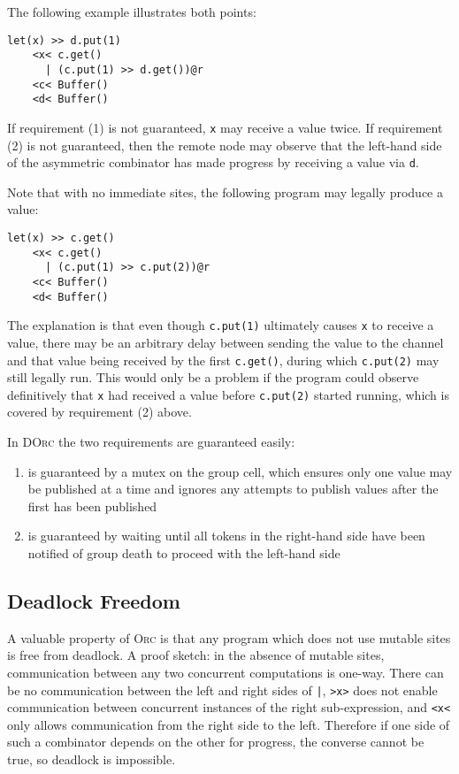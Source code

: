 \documentclass[10pt,letterpaper]{article}
\begin{document}
The following example illustrates both points:
\begin{verbatim}
let(x) >> d.put(1)
    <x< c.get()
      | (c.put(1) >> d.get())@r
    <c< Buffer()
    <d< Buffer()
\end{verbatim}
If requirement (1) is not guaranteed, \texttt{x} may receive a value twice. If
requirement (2) is not guaranteed, then the remote node may observe that the
left-hand side of the asymmetric combinator has made progress by receiving a
value via \texttt{d}.

Note that with no immediate sites, the following program may legally produce a
value:
\begin{verbatim}
let(x) >> c.get()
    <x< c.get()
      | (c.put(1) >> c.put(2))@r
    <c< Buffer()
    <d< Buffer()
\end{verbatim}
The explanation is that even though \texttt{c.put(1)} ultimately causes
\texttt{x} to receive a value, there may be an arbitrary delay between sending
the value to the channel and that value being received by the first
\texttt{c.get()}, during which \texttt{c.put(2)} may still legally run. This
would only be a problem if the program could observe definitively that
\texttt{x} had received a value before \texttt{c.put(2)} started running, which
is covered by requirement (2) above.

In \textsc{DOrc} the two requirements are guaranteed easily:
\begin{enumerate}
\item is guaranteed by a mutex on the group cell, which ensures only one value
may be published at a time and ignores any attempts to publish values after the
first has been published
\item is guaranteed by waiting until all tokens in the right-hand side have
been notified of group death to proceed with the left-hand side
\end{enumerate}

\subsection{Deadlock Freedom}

A valuable property of \textsc{Orc} is that any program which does not use
mutable sites is free from deadlock. A proof sketch: in the absence of mutable
sites, communication between any two concurrent computations is one-way. There
can be no communication between the left and right sides of \texttt{|},
\texttt{>x>} does not enable communication between concurrent instances of the
right sub-expression, and \texttt{<x<} only allows communication from the right
side to the left. Therefore if one side of such a combinator depends on the
other for progress, the converse cannot be true, so deadlock is impossible.
\end{document}
